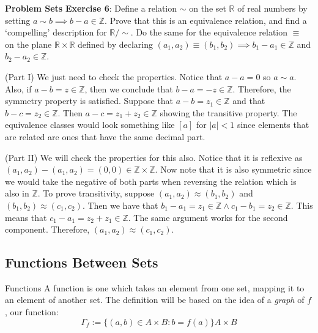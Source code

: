 \documentclass{report}
\begin{document}
\begin{exercises}{\textbf{Problem Sets}}
    \textbf{Exercise 6}: Define a relation $\sim $ on the set $\mathbb{R}$ of real numbers by setting $a \sim b \implies b - a \in \mathbb{Z}$. Prove that this is an equivalence relation, and find a `compelling' description for $\mathbb{R} / \sim $. Do the same for the equivalence relation $\equiv $ on the plane $\mathbb{R} \times \mathbb{R}$ defined by declaring $(a_{1}, a_{2}) \equiv (b_{1}, b_{2}) \implies b_{1} - a_{1} \in \mathbb{Z}$ and $b_{2} - a_{2} \in \mathbb{Z}$.

    \begin{answer}
        (Part I) We just need to check the properties. Notice that $a - a = 0$ so $a \sim a$. Also, if $a - b = z\in \mathbb{Z}$, then we conclude that $b - a = -z \in \mathbb{Z}$. Therefore, the symmetry property is satisfied. Suppose that $a - b = z_{1} \in \mathbb{Z}$ and that $b - c = z_{2} \in \mathbb{Z}$. Then $a - c = z_{1} + z_{2} \in \mathbb{Z}$ showing the transitive property. The equivalence classes would look something like $[a]$ for $\lvert a \rvert < 1$ since elements that are related are ones that have the same decimal part. 

        (Part II) We will check the properties for this also. Notice that it is reflexive as $(a_{1}, a_{2}) - (a_{1}, a_{2}) = (0, 0) \in \mathbb{Z} \times \mathbb{Z}$. Now note that it is also symmetric since we would take the negative of both parts when reversing the relation which is also in $\mathbb{Z}$. To prove transitivity, suppose $(a_{1}, a_{2}) \approx (b_{1}, b_{2})$ and $(b_{1}, b_{2}) \approx (c_{1}, c_{2})$. Then we have that $b_{1} - a_{1} = z_{1} \in \mathbb{Z} \land c_{1} - b_{1} = z_{2} \in \mathbb{Z}$. This means that $c_{1} - a_{1} = z_{2} + z_{1} \in \mathbb{Z}$. The same argument works for the second component. Therefore, $(a_{1}, a_{2}) \approx (c_{1}, c_{2})$.
    \end{answer}
\end{exercises}

\newpage
\begin{topic}
    \section{Functions Between Sets}
\end{topic}

\begin{definition}[\label{def:1.2.2}]{Functions}
    A function is one which takes an element from one set, mapping it to an element of another set. The definition will be based on the idea of a \textit{graph} of $f$, our function:
    \begin{equation*}
        \Gamma_{f} := \{(a,b) \in A \times B : b = f(a)\} A \times B
    \end{equation*}
\end{definition}
\end{document}
